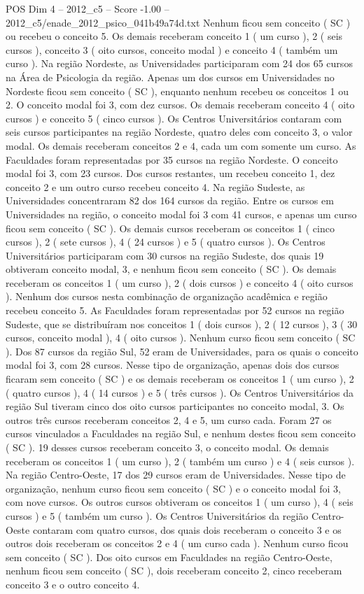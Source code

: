 \begin{textsample}{POS Dim 4 – 2012\_c5 – Score -1.00 – 2012\_c5/enade\_2012\_psico\_041b49a74d.txt}
Nenhum ficou sem conceito ( SC ) ou recebeu o conceito 5.
Os demais receberam conceito 1 ( um curso ), 2 ( seis cursos ), conceito 3 ( oito cursos, conceito modal ) e conceito 4 ( também um curso ).
Na região Nordeste, as Universidades participaram com 24 dos 65 cursos na Área de Psicologia da região.
Apenas um dos cursos em Universidades no Nordeste ficou sem conceito ( SC ), enquanto nenhum recebeu os conceitos 1 ou 2.
O conceito modal foi 3, com dez cursos.
Os demais receberam conceito 4 ( oito cursos ) e conceito 5 ( cinco cursos ).
Os Centros Universitários contaram com seis cursos participantes na região Nordeste, quatro deles com conceito 3, o valor modal.
Os demais receberam conceitos 2 e 4, cada um com somente um curso.
As Faculdades foram representadas por 35 cursos na região Nordeste.
O conceito modal foi 3, com 23 cursos.
Dos cursos restantes, um recebeu conceito 1, dez conceito 2 e um outro curso recebeu conceito 4.
Na região Sudeste, as Universidades concentraram 82 dos 164 cursos da região.
Entre os cursos em Universidades na região, o conceito modal foi 3 com 41 cursos, e apenas um curso ficou sem conceito ( SC ).
Os demais cursos receberam os conceitos 1 ( cinco cursos ), 2 ( sete cursos ), 4 ( 24 cursos ) e 5 ( quatro cursos ).
Os Centros Universitários participaram com 30 cursos na região Sudeste, dos quais 19 obtiveram conceito modal, 3, e nenhum ficou sem conceito ( SC ).
Os demais receberam os conceitos 1 ( um curso ), 2 ( dois cursos ) e conceito 4 ( oito cursos ).
Nenhum dos cursos nesta combinação de organização acadêmica e região recebeu conceito 5.
As Faculdades foram representadas por 52 cursos na região Sudeste, que se distribuíram nos conceitos 1 ( dois cursos ), 2 ( 12 cursos ), 3 ( 30 cursos, conceito modal ), 4 ( oito cursos ).
Nenhum curso ficou sem conceito ( SC ).
Dos 87 cursos da região Sul, 52 eram de Universidades, para os quais o conceito modal foi 3, com 28 cursos.
Nesse tipo de organização, apenas dois dos cursos ficaram sem conceito ( SC ) e os demais receberam os conceitos 1 ( um curso ), 2 ( quatro cursos ), 4 ( 14 cursos ) e 5 ( três cursos ).
Os Centros Universitários da região Sul tiveram cinco dos oito cursos participantes no conceito modal, 3.
Os outros três cursos receberam conceitos 2, 4 e 5, um curso cada.
Foram 27 os cursos vinculados a Faculdades na região Sul, e nenhum destes ficou sem conceito ( SC ). 19 desses cursos receberam conceito 3, o conceito modal.
Os demais receberam os conceitos 1 ( um curso ), 2 ( também um curso ) e 4 ( seis cursos ).
Na região Centro-Oeste, 17 dos 29 cursos eram de Universidades.
Nesse tipo de organização, nenhum curso ficou sem conceito ( SC ) e o conceito modal foi 3, com nove cursos.
Os outros cursos obtiveram os conceitos 1 ( um curso ), 4 ( seis cursos ) e 5 ( também um curso ).
Os Centros Universitários da região Centro-Oeste contaram com quatro cursos, dos quais dois receberam o conceito 3 e os outros dois receberam os conceitos 2 e 4 ( um curso cada ).
Nenhum curso ficou sem conceito ( SC ).
Dos oito cursos em Faculdades na região Centro-Oeste, nenhum ficou sem conceito ( SC ), dois receberam conceito 2, cinco receberam conceito 3 e o outro conceito 4.

\end{textsample}
